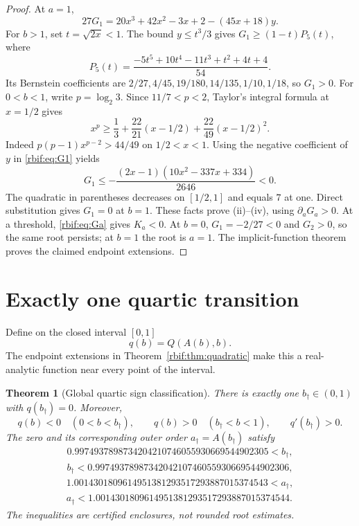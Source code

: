 \documentclass[11pt,a4paper]{article}
\newtheorem{theorem}{Theorem}[section]
\theoremstyle{definition}\newtheorem{definition}[theorem]{Definition}
\theoremstyle{remark}\newtheorem{remark}[theorem]{Remark}
\newcommand{\rbpa}{a_\dagger}
\newcommand{\rbpb}{b_\dagger}
\numberwithin{equation}{section}
\begin{document}
\begin{proof}
At $a=1$,
\begin{equation}
 27G_1=20x^3+42x^2-3x+2-(45x+18)y.
 \label{rbif:eq:G1}
\end{equation}
For $b>1$, set $t=\sqrt{2x}<1$. The bound $y\le t^3/3$ gives
$G_1\ge(1-t)P_5(t)$, where
\[
 P_5(t)=\frac{-5t^5+10t^4-11t^3+t^2+4t+4}{54}.
\]
Its Bernstein coefficients are
$2/27,4/45,19/180,14/135,1/10,1/18$, so $G_1>0$.
For $0<b<1$, write $p=\log_2 3$. Since $11/7<p<2$, Taylor's
integral formula at $x=1/2$ gives
\[
 x^p\ge\frac13+\frac{22}{21}(x-1/2)+\frac{22}{49}(x-1/2)^2.
\]
Indeed $p(p-1)x^{p-2}>44/49$ on $1/2<x<1$.
Using the negative coefficient of $y$ in \eqref{rbif:eq:G1} yields
\[
 G_1\le-\frac{(2x-1)(10x^2-337x+334)}{2646}<0.
\]
The quadratic in parentheses decreases on $[1/2,1]$ and equals $7$ at
one. Direct substitution gives $G_1=0$ at $b=1$.
These facts prove (ii)--(iv), using $\partial_aG_a>0$.
At a threshold, \eqref{rbif:eq:Ga} gives $K_a<0$.
At $b=0$, $G_1=-2/27<0$ and $G_2>0$, so the same root persists;
at $b=1$ the root is $a=1$. The implicit-function theorem proves the
claimed endpoint extensions.
\end{proof}

\section{Exactly one quartic transition}
\label{rbif:sec:quartic}
Define on the closed interval $[0,1]$
\begin{equation}
 q(b)=Q(A(b),b).
 \label{rbif:eq:qdef}
\end{equation}
The endpoint extensions in Theorem~\ref{rbif:thm:quadratic} make this a
real-analytic function near every point of the interval.

\begin{theorem}[Global quartic sign classification]
\label{rbif:thm:quartic}
There is exactly one $\rbpb\in(0,1)$ with $q(\rbpb)=0$.
Moreover,
\begin{equation}
 q(b)<0\quad(0<b<\rbpb),\qquad
 q(b)>0\quad(\rbpb<b<1),\qquad q'(\rbpb)>0.
 \label{rbif:eq:qsigns}
\end{equation}
The zero and its corresponding outer order $\rbpa=A(\rbpb)$ satisfy
\begin{equation}
 \begin{gathered}
 0.9974937898734204210746055930669544902305<\rbpb,\\
 \rbpb<0.9974937898734204210746055930669544902306,
 \end{gathered}\label{rbif:eq:bbox}
\end{equation}
\begin{equation}
 \begin{gathered}
 1.0014301809614951381293517293887015374543<\rbpa,\\
 \rbpa<1.0014301809614951381293517293887015374544.
 \end{gathered}\label{rbif:eq:abox}
\end{equation}
The inequalities are certified enclosures, not rounded root estimates.
\end{theorem}
\end{document}
